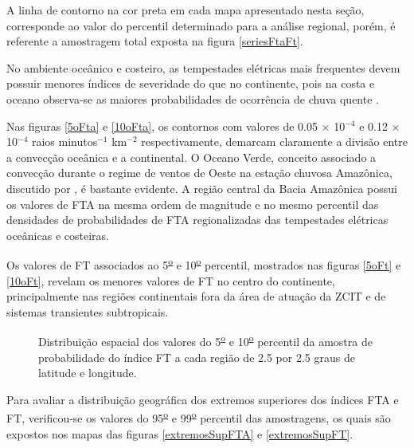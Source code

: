 A linha de contorno na cor preta em cada mapa apresentado nesta seção, corresponde ao valor do percentil determinado para a análise regional, porém, é referente a amostragem total exposta na figura \ref{seriesFtaFt}.

No ambiente oceânico e costeiro, as tempestades elétricas mais frequentes devem possuir menores índices de severidade do que no continente, pois na costa e oceano observa-se as maiores probabilidades de ocorrência de chuva quente \cite{Liu2009}. 

Nas figuras \ref{5oFta} e \ref{10oFta}, os contornos com valores de 0.05 $\times$ 10$^{-4}$ e 0.12 $\times$ 10$^{-4}$ raios minutos$^{-1}$
km$^{-2}$ respectivamente, demarcam claramente a divisão entre a convecção oceânica e a continental. O Oceano Verde, conceito associado a convecção durante o regime de ventos de Oeste na estação chuvosa Amazônica, discutido por , é bastante evidente. A região central da Bacia Amazônica possui os  valores de FTA na mesma ordem de magnitude e no mesmo percentil das densidades de probabilidades de FTA regionalizadas das tempestades elétricas oceânicas e costeiras.

Os valores de FT associados ao 5\textsuperscript{\underline{o}} e 10\textsuperscript{\underline{o}} percentil, mostrados nas figuras \ref{5oFt} e \ref{10oFt}, revelam os menores valores de FT no centro do continente, principalmente nas regiões continentais fora da área de atuação da ZCIT e de sistemas transientes subtropicais.

\begin{figure}[!ht]
  \caption{Distribuição espacial dos valores do 5\textsuperscript{\underline{o}} e 10\textsuperscript{\underline{o}} percentil da amostra de probabilidade do índice FT a cada região de 2.5 por 2.5 graus de latitude e longitude.}
\label{extremosInfFT}
\end{figure} 

Para avaliar a distribuição geográfica dos extremos superiores dos índices FTA e FT, verificou-se os valores do 95\textsuperscript{\underline{o}} e 99\textsuperscript{\underline{o}} percentil das amostragens, os quais são expostos nos mapas das figuras \ref{extremosSupFTA} e \ref{extremosSupFT}.






